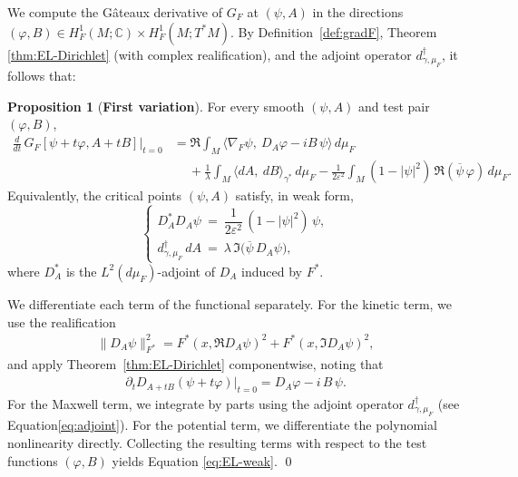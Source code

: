 \documentclass[fleqn,11pt,twoside]{article}
\makeatletter
\renewenvironment{proof}[1][\proofname]{\par
  \normalfont
  \topsep6\p@\@plus6\p@ \trivlist
  \item[\hskip\labelsep\textbf{%
    #1\@addpunct{.}}]\ignorespaces
}{%
  \qed\endtrivlist
}
\theoremstyle{definition}
\newtheorem{proposition}{Proposition}
\makeatother
\begin{document}
We compute the G\^ateaux derivative of $G_F$ at $(\psi, A)$ in the directions 
$(\varphi, B) \in H^1_F(M;\mathbb{C}) \times H^1_F(M;T^*M)$. 
By Definition~\ref{def:gradF}, Theorem \ref{thm:EL-Dirichlet} (with complex realification), and the adjoint operator $d^\dagger_{\gamma,\mu_F}$, it follows that:
\begin{proposition}[\textbf{First variation}]
\label{prop:EL}
For every smooth $(\psi,A)$ and test pair $(\varphi,B)$,
\begin{align*}
  \frac{d}{dt}\, G_F[\psi+t\varphi, A+tB]\Big|_{t=0}
  &= \Re \int_M \!\!\big\langle \nabla_F \psi,\ D_A\varphi - i B\,\psi \big\rangle \, d\mu_F \\
  &\quad\ + \frac{1}{\lambda}\int_M \!\!\langle dA,\ dB\rangle_{\gamma^*}\, d\mu_F
  - \frac{1}{2\varepsilon^2}\int_M \!(1-|\psi|^2)\,\Re(\overline{\psi}\,\varphi)\, d\mu_F.
\end{align*}
Equivalently, the critical points $(\psi,A)$ satisfy, in weak form,
\begin{equation}\label{eq:EL-weak}
\begin{cases}
 D_A^* D_A \psi \ =\ \dfrac{1}{2\varepsilon^2}\,(1-|\psi|^2)\,\psi,\\[6pt]
 d^\dagger_{\gamma,\mu_F}\, dA \ =\ \lambda\, \Im\big(\overline{\psi}\, D_A\psi\big),
\end{cases}
\end{equation}
where $D_A^*$ is the $L^2(d\mu_F)$-adjoint of $D_A$ induced by $F^*$.
\end{proposition}

\begin{proof}
We differentiate each term of the functional separately. 
For the kinetic term, we use the realification 
\begin{align*}
\|D_A\psi\|_{F^*}^2 = F^*(x, \Re D_A\psi)^2 + F^*(x, \Im D_A\psi)^2,
\end{align*}
and apply Theorem~\ref{thm:EL-Dirichlet} componentwise, noting that
\begin{align*}
\partial_t D_{A+tB}(\psi+t\varphi)\big|_{t=0} = D_A\varphi - i\,B\,\psi.
\end{align*}
For the Maxwell term, we integrate by parts using the adjoint operator $d^\dagger_{\gamma,\mu_F}$ 
(see Equation\eqref{eq:adjoint}). 
For the potential term, we differentiate the polynomial nonlinearity directly. Collecting the resulting terms with respect to the test functions $(\varphi,B)$ yields Equation \eqref{eq:EL-weak}.
\end{proof}
\end{document}
